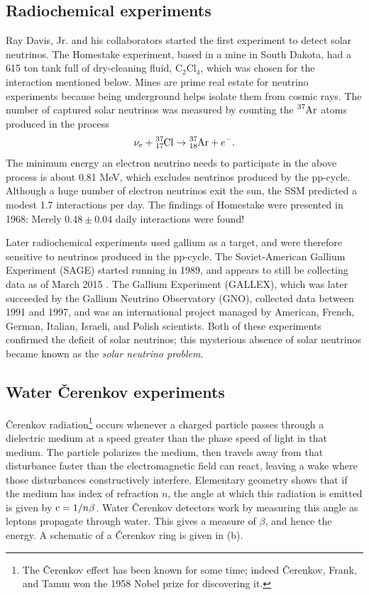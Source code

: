 \subsection{Radiochemical experiments}
Ray Davis, Jr. and his collaborators started the first experiment to detect
solar neutrinos. The Homestake experiment, based in a mine in South Dakota,
had a 615 ton tank full of dry-cleaning fluid, $\text{C}_2\text{Cl}_4$,
which was chosen for the interaction mentioned below.
Mines are prime real estate for neutrino experiments because being underground
helps isolate them from cosmic rays. The number of captured solar neutrinos
was measured by counting the $\ce{^{37}Ar}$ atoms produced in
the process
\begin{equation}
  \nu_e+\ce{^{37}_{17}Cl}\to\ce{^{37}_{18}Ar}+e^-.
\end{equation}
The minimum energy an electron neutrino needs to participate in the above
process is about 0.81 MeV, which excludes neutrinos produced by the pp-cycle.
Although a huge number of electron neutrinos exit the sun, the SSM
predicted a modest 1.7 interactions per day. The findings
of Homestake were presented in 1968: Merely $0.48\pm0.04$ daily interactions
were found!

Later radiochemical experiments used gallium as a target, and were therefore
sensitive to neutrinos produced in the pp-cycle. The Soviet-American
Gallium Experiment (SAGE) started running in 1989, and appears to still be
collecting data as of March 2015 \cite{gavrin_current_2015}. 
The Gallium Experiment (GALLEX),
which was later succeeded by the Gallium Neutrino Observatory (GNO),
collected data between 1991 and 1997, and was an international project
managed by American, French, German, Italian, Israeli, and Polish scientists.
Both of these experiments confirmed the deficit of solar neutrinos; this
mysterious absence of solar neutrinos became known as the {\it solar
neutrino problem}.

\subsection{Water \v{C}erenkov experiments}
\v{C}erenkov radiation\footnote{The \v{C}erenkov effect has been known
for some time; indeed \v{C}erenkov, Frank, and Tamm won the 1958
Nobel prize for discovering it.} occurs whenever a charged particle passes through a
dielectric medium at a speed greater than the phase speed of light in that
medium. The particle polarizes the medium, then travels away from that
disturbance faster than the electromagnetic field can react, leaving
a wake where those disturbances constructively interfere. Elementary
geometry shows that if the medium has index of refraction $n$, the angle
at which this radiation is emitted is given by $\operatorname{c}=1/n\beta$. Water
\v{C}erenkov detectors work by measuring this angle as leptons propagate
through water. This gives a measure of $\beta$, and hence the energy.
A schematic of a \v{C}erenkov ring is given in  (b).

